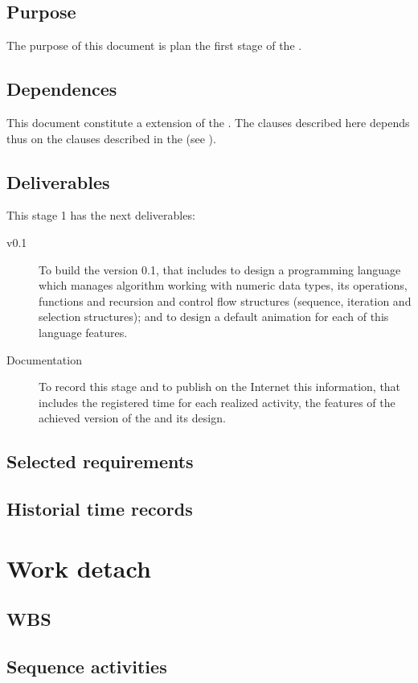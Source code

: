 \documentclass[twocolumn]{article}
\begin{document}
\subsection{Purpose}
The purpose of this document is plan the first stage of the
\favp.

\subsection{Dependences}
This document constitute a extension of the \favpl. The clauses
described here depends thus on the clauses described in the \favpl
(see ).

\subsection{Deliverables}
This stage 1 has the next deliverables:

\begin{description}
\item[\fav v0.1] To build the \fav version 0.1, that includes to design a
  \fav programming language which manages algorithm working with
  numeric data types, its operations, functions and recursion and
  control flow structures (sequence, iteration and selection
  structures); and to design a default animation for each of this
  language features.
\item[Documentation] To record this stage and to publish on the
  Internet this information, that includes the registered time for
  each realized activity, the features of the achieved version of the
  \fav and its design.
\end{description}

\subsection{Selected requirements}
\subsection{Historial time records}

\section{Work detach}
\subsection{WBS}
\subsection{Sequence activities}
\end{document}
